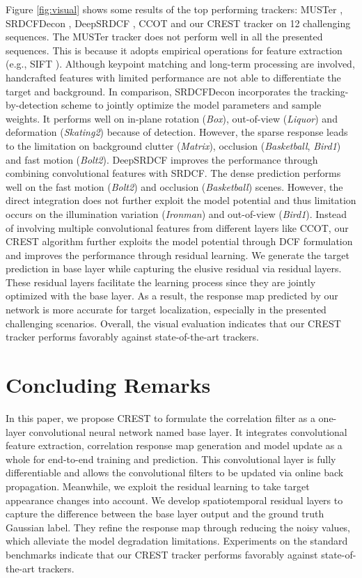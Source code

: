 \documentclass[10pt,twocolumn,letterpaper]{article}
\begin{document}
Figure \ref{fig:visual} shows some results of the top performing trackers: MUSTer \cite{hong-cvpr15-muster}, SRDCFDecon \cite{danelljan-CVPR16-adaptive}, DeepSRDCF \cite{Danelljan-iccvw15-DeepSRDCF}, CCOT \cite{martin-eccv16-beyond} and our CREST tracker on 12 challenging sequences. The MUSTer tracker does not perform well in all the presented sequences. This is because it adopts empirical operations for feature extraction (e.g., SIFT \cite{lowe-ijcv04-sift}). Although keypoint matching and long-term processing are involved, handcrafted features with limited performance are not able to differentiate the target and background. In comparison, SRDCFDecon incorporates the tracking-by-detection scheme to jointly optimize the model parameters and sample weights. It performs well on in-plane rotation (\emph{Box}), out-of-view (\emph{Liquor}) and deformation (\emph{Skating2}) because of detection. However, the sparse response leads to the limitation on background clutter (\emph{Matrix}), occlusion (\emph{Basketball}, \emph{Bird1}) and fast motion (\emph{Bolt2}). DeepSRDCF improves the performance through combining convolutional features with SRDCF. The dense prediction performs well on the fast motion (\emph{Bolt2}) and occlusion (\emph{Basketball}) scenes. However, the direct integration does not further exploit the model potential and thus limitation occurs on the illumination variation (\emph{Ironman}) and out-of-view (\emph{Bird1}). Instead of involving multiple convolutional features from different layers like CCOT, our CREST algorithm further exploits the model potential through DCF formulation and improves the performance through residual learning. We generate the target prediction in base layer while capturing the elusive residual via residual layers. These residual layers facilitate the learning process since they are jointly optimized with the base layer. As a result, the response map predicted by our network is more accurate for target localization, especially in the presented challenging scenarios. Overall, the visual evaluation indicates that our CREST tracker performs favorably against state-of-the-art trackers.


\section{Concluding Remarks}

In this paper, we propose CREST to formulate the correlation filter as a one-layer convolutional neural network named base layer. It integrates convolutional feature extraction, correlation response map generation and model update as a whole for end-to-end training and prediction. This convolutional layer is fully differentiable and allows the convolutional filters to be updated via online back propagation. Meanwhile, we exploit the residual learning to take target appearance changes into account. We develop spatiotemporal residual layers to capture the difference between the base layer output and the ground truth Gaussian label. They refine the response map through reducing the noisy values, which alleviate the model degradation limitations. Experiments on the standard benchmarks indicate that our CREST tracker performs favorably against state-of-the-art trackers.
\end{document}
